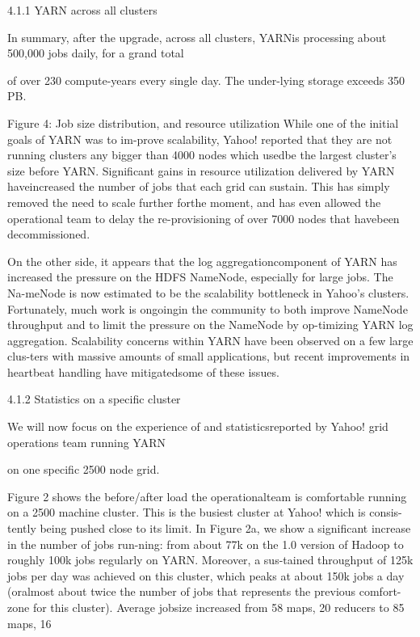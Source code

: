 4.1.1 YARN across all clusters

In summary, after the upgrade, across all clusters, YARNis processing about 500,000 jobs daily, for a grand total

of over 230 compute-years every single day. The under-lying storage exceeds 350 PB.

Figure 4: Job size distribution, and resource utilization
While one of the initial goals of YARN was to im-prove scalability, Yahoo! reported that they are not running clusters any bigger than 4000 nodes which usedbe the largest cluster's size before YARN. Significant
gains in resource utilization delivered by YARN haveincreased the number of jobs that each grid can sustain.
This has simply removed the need to scale further forthe moment, and has even allowed the operational team
to delay the re-provisioning of over 7000 nodes that havebeen decommissioned.

On the other side, it appears that the log aggregationcomponent of YARN has increased the pressure on the
HDFS NameNode, especially for large jobs. The Na-meNode is now estimated to be the scalability bottleneck
in Yahoo's clusters. Fortunately, much work is ongoingin the community to both improve NameNode throughput and to limit the pressure on the NameNode by op-timizing YARN log aggregation. Scalability concerns
within YARN have been observed on a few large clus-ters with massive amounts of small applications, but recent improvements in heartbeat handling have mitigatedsome of these issues.

4.1.2 Statistics on a specific cluster

We will now focus on the experience of and statisticsreported by Yahoo! grid operations team running YARN

on one specific 2500 node grid.

Figure 2 shows the before/after load the operationalteam is comfortable running on a 2500 machine cluster. This is the busiest cluster at Yahoo! which is consis-tently being pushed close to its limit. In Figure 2a, we
show a significant increase in the number of jobs run-ning: from about 77k on the 1.0 version of Hadoop to
roughly 100k jobs regularly on YARN. Moreover, a sus-tained throughput of 125k jobs per day was achieved on
this cluster, which peaks at about 150k jobs a day (oralmost about twice the number of jobs that represents
the previous comfort-zone for this cluster). Average jobsize increased from 58 maps, 20 reducers to 85 maps, 16

